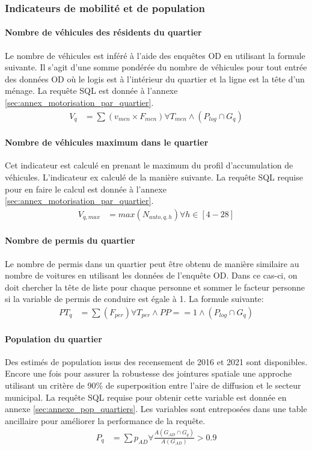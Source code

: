     \subsubsection{Indicateurs de mobilité et de population}
    \paragraph{Nombre de véhicules des résidents du quartier}\label{par:n_vehicules_quartiers} Le nombre de véhicules est inféré à l'aide des enquêtes OD en utilisant la formule suivante. Il s'agit d'une somme pondérée du nombre de véhicules pour tout entrée des données OD où le logis est à l'intérieur du quartier et la ligne est la tête d'un ménage. La requête SQL est donnée à l'annexe \ref{sec:annex_motorisation_par_quartier}.
    \begin{align}
        V_{q} &= \sum{\left(v_{men} \times F_{men}\right)} \forall T_{men}  \wedge \left(P_{log}\cap G_q\right)
    \end{align}
    \paragraph{Nombre de véhicules maximum dans le quartier} Cet indicateur est calculé en prenant le maximum du profil d'accumulation de véhicules. L'indicateur ex calculé de la manière suivante. La requête SQL requise pour en faire le calcul est donnée à l'annexe \ref{sec:annex_motorisation_par_quartier}.
    \begin{align}
        V_{q,max} &= max\left(N_{auto,q,h}\right) \forall h \in [4-28]
    \end{align}
    \paragraph{Nombre de permis du quartier} Le nombre de permis dans un quartier peut être obtenu de manière similaire au nombre de voitures en utilisant les données de l'enquête OD. Dans ce cas-ci, on doit chercher la tête de liste pour chaque personne et sommer le facteur personne si la variable de permis de conduire est égale à 1. La formule suivante:
    \begin{align}
        PT_{q} &= \sum{\left(F_{per}\right)} \forall T_{per}\wedge PP==1  \wedge \left(P_{log}\cap G_q\right)
    \end{align}
    \paragraph{Population du quartier} Des estimés de population issus des recensement de 2016 et 2021 sont disponibles. Encore une fois pour assurer la robustesse des jointures spatiale une approche utilisant un critère de 90\% de superposition entre l'aire de diffusion et le secteur municipal. La requête SQL requise pour obtenir cette variable est donnée en annexe \ref{sec:annexe_pop_quartiers}. Les variables sont entreposées dans une table ancillaire pour améliorer la performance de la requête.
    \begin{align}
        P_{q}&= \sum{p_{AD}} \forall \frac{A\left(G_{AD}\cap G_q\right)}{A\left(G_{AD}\right)}>0.9
    \end{align}
